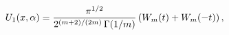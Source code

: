 \[U_{1}(x,\alpha)=\frac{\pi^{1/2}}{2^{(m+2)/(2m)}\mathop{\Gamma\/}\nolimits\!%
\left(1/m\right)}\left(W_{m}(t)+W_{m}(-t)\right),\]